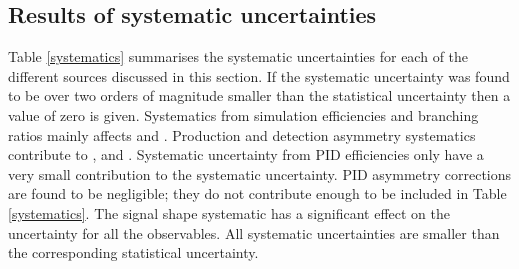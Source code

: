 \subsection{Results of systematic uncertainties}

Table \ref{systematics} summarises the systematic uncertainties for each of the different sources discussed in this section. If the systematic uncertainty was found to be over two orders of magnitude smaller than the statistical uncertainty then a value of zero is given. Systematics from simulation efficiencies and branching ratios mainly affects \Rkk and \Rpipi. Production and detection asymmetry systematics contribute to \Akpi, \Akk and \Apipi. Systematic uncertainty from PID efficiencies only have a very small contribution to the systematic uncertainty. PID asymmetry corrections are found to be negligible; they do not contribute enough to be included in Table \ref{systematics}. The signal shape systematic has a significant effect on the uncertainty for all the \CP observables. All systematic uncertainties are smaller than the corresponding statistical uncertainty. 

